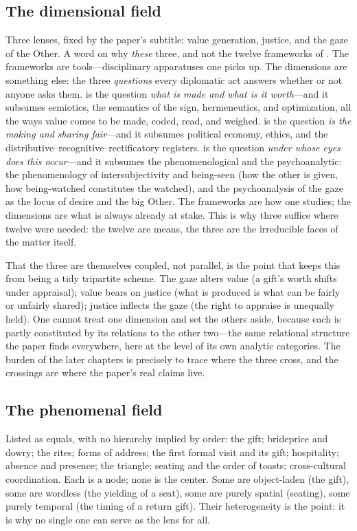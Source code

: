 \subsection{The dimensional field}
Three lenses, fixed by the paper's subtitle: value generation, justice, and the gaze of the Other. A word on why \emph{these} three, and not the twelve frameworks of . The frameworks are tools---disciplinary apparatuses one picks up. The dimensions are something else: the three \emph{questions} every diplomatic act answers whether or not anyone asks them.  is the question \emph{what is made and what is it worth}---and it subsumes semiotics, the semantics of the sign, hermeneutics, and optimization, all the ways value comes to be made, coded, read, and weighed.  is the question \emph{is the making and sharing fair}---and it subsumes political economy, ethics, and the distributive--recognitive--rectificatory registers.  is the question \emph{under whose eyes does this occur}---and it subsumes the phenomenological and the psychoanalytic: the phenomenology of intersubjectivity and being-seen (how the other is given, how being-watched constitutes the watched), and the psychoanalysis of the gaze as the locus of desire and the big Other. The frameworks are how one studies; the dimensions are what is always already at stake. This is why three suffice where twelve were needed: the twelve are means, the three are the irreducible faces of the matter itself.

That the three are themselves coupled, not parallel, is the point that keeps this from being a tidy tripartite scheme. The gaze alters value (a gift's worth shifts under appraisal); value bears on justice (what is produced is what can be fairly or unfairly shared); justice inflects the gaze (the right to appraise is unequally held). One cannot treat one dimension and set the others aside, because each is partly constituted by its relations to the other two---the same relational structure the paper finds everywhere, here at the level of its own analytic categories. The burden of the later chapters is precisely to trace where the three cross, and the crossings are where the paper's real claims live.

\subsection{The phenomenal field}
Listed as equals, with no hierarchy implied by order: the gift; brideprice and dowry; the rites; forms of address; the first formal visit and its gift; hospitality; absence and presence; the triangle; seating and the order of toasts; cross-cultural coordination. Each is a node; none is the center. Some are object-laden (the gift), some are wordless (the yielding of a seat), some are purely spatial (seating), some purely temporal (the timing of a return gift). Their heterogeneity is the point: it is why no single one can serve as the lens for all.

